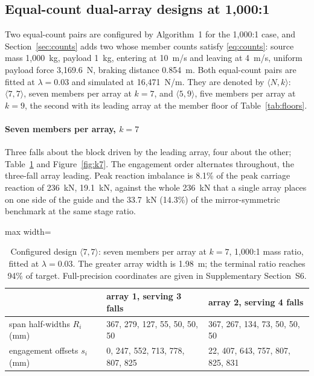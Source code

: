 \documentclass[preprint,12pt,number]{elsarticle}
\newcommand{\cfg}[2]{\langle #1,#2\rangle}
\begin{document}
\subsection{Equal-count dual-array designs at 1,000:1}
\label{sec:duals}

Two equal-count pairs are configured by Algorithm~1 for the 1,000:1 case, and Section~\ref{sec:counts} adds two whose member counts satisfy \eqref{eq:counts}: source mass 1,000~kg, payload 1~kg, entering at 10~m/s and leaving at 4~m/s, uniform payload force 3,169.6~N, braking distance 0.854~m. Both equal-count pairs are fitted at $\lambda = 0.03$ and simulated at 16,471~N/m. They are denoted by $\cfg{N}{k}$: $\cfg{7}{7}$, seven members per array at $k=7$, and $\cfg{5}{9}$, five members per array at $k=9$, the second with its leading array at the member floor of Table~\ref{tab:floors}.

\paragraph{Seven members per array, $k=7$} Three falls about the block driven by the leading array, four about the other; Table~\ref{tab:k7} and Figure~\ref{fig:k7}. The engagement order alternates throughout, the three-fall array leading. Peak reaction imbalance is 8.1\% of the peak carriage reaction of 236~kN, 19.1~kN, against the whole 236~kN that a single array places on one side of the guide and the 33.7~kN (14.3\%) of the mirror-symmetric benchmark at the same stage ratio.

\begin{table}[H]
\centering
\caption{Configured design $\cfg{7}{7}$: seven members per array at $k=7$, 1,000:1 mass ratio, fitted at $\lambda = 0.03$. The greater array width is 1.98~m; the terminal ratio reaches 94\% of target. Full-precision coordinates are given in Supplementary Section~S6.}
\label{tab:k7}
\begin{adjustbox}{max width=\linewidth}
\begin{tabular}{lll}
\toprule
& array 1, serving 3 falls & array 2, serving 4 falls \\
\midrule
span half-widths $R_i$ (mm)  & 367, 279, 127, 55, 50, 50, 50 & 367, 267, 134, 73, 50, 50, 50 \\
engagement offsets $s_i$ (mm) & 0, 247, 552, 713, 778, 807, 825 & 22, 407, 643, 757, 807, 825, 831 \\
\bottomrule
\end{tabular}
\end{adjustbox}
\end{table}
\end{document}
